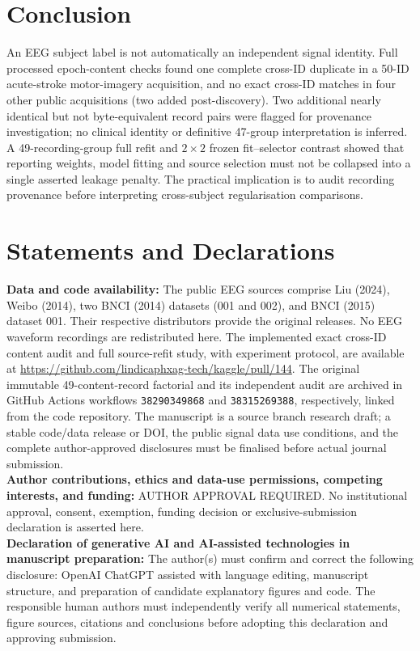 \documentclass[preprint,12pt]{elsarticle}
\begin{document}
\section{Conclusion}
An EEG subject label is not automatically an independent
signal identity. Full processed epoch-content checks found
one complete cross-ID duplicate in a 50-ID acute-stroke
motor-imagery acquisition, and no exact cross-ID matches
in four other public acquisitions (two added post-discovery).
Two additional nearly identical but not byte-equivalent
record pairs were flagged for provenance investigation;
no clinical identity or definitive 47-group interpretation
is inferred. A 49-recording-group
full refit and $2\times2$ frozen fit--selector contrast
showed that reporting weights, model fitting and source
selection must not be collapsed into a single asserted
leakage penalty. The practical implication is to audit
recording provenance before interpreting cross-subject
regularisation comparisons.

\section*{Statements and Declarations}
\textbf{Data and code availability:}
The public EEG sources comprise Liu (2024),
Weibo (2014), two BNCI (2014) datasets
(001 and 002), and BNCI (2015) dataset 001.
Their respective distributors provide the original releases.
No EEG waveform recordings are redistributed here.
The implemented exact cross-ID content audit and
full source-refit study, with experiment protocol,
are available at
\url{https://github.com/lindicaphxag-tech/kaggle/pull/144}.
The original immutable 49-content-record
factorial and its independent audit are archived
in GitHub Actions workflows
\texttt{38290349868} and \texttt{38315269388},
respectively, linked from the code repository. The manuscript is a source branch
research draft; a stable code/data release or DOI,
the public signal data use conditions, and
the complete author-approved disclosures
must be finalised before actual journal submission.\\
\textbf{Author contributions, ethics and data-use permissions,
competing interests, and funding:} AUTHOR APPROVAL REQUIRED.
No institutional approval, consent, exemption, funding decision or
exclusive-submission declaration is asserted here.\\
\textbf{Declaration of generative AI and AI-assisted technologies
in manuscript preparation:}
The author(s) must confirm and correct the following disclosure:
OpenAI ChatGPT assisted with language editing, manuscript structure,
and preparation of candidate explanatory figures and code.
The responsible human authors must independently verify all
numerical statements, figure sources, citations and conclusions
before adopting this declaration and approving submission.



\end{document}
